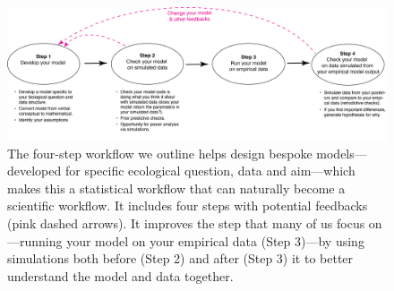 \documentclass[11pt]{article}
\begin{document}
\newpage

\begin{figure}[ht]
\centering
\noindent \includegraphics[width=1\textwidth]{figures/workflow.png}
\caption{The four-step workflow we outline helps design bespoke models---developed for specific ecological question, data and aim---which makes this a statistical workflow that can naturally become a scientific workflow. It includes four steps with potential feedbacks (pink dashed arrows). It improves the step that many of us focus on---running your model on your empirical data (Step 3)---by using simulations both before (Step 2) and after (Step 3) it to better understand the model and data together.}
\label{fig:workflow}
\end{figure}
\end{document}
